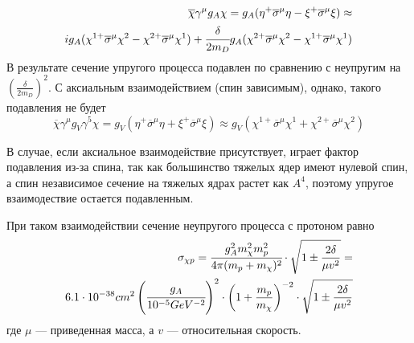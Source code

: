 \begin{equation}
	\begin{split}
	\overline{\chi}\gamma^{\mu}g_A \chi = 
	g_A(\eta^+ \overline{\sigma}^{\mu} \eta - \xi^+ \overline{\sigma}^{\mu} \xi) \approx \\ 
	i g_A (\chi^{1+} \overline{\sigma}^{\mu} \chi^2 - \chi^{2+} \overline{\sigma}^{\mu} \chi^1) + \cfrac{\delta}{2m_D}g_A 
	(
		\chi^{2+} \overline{\sigma}^{\mu}\chi^2 - 
		\chi^{1+}  \overline{\sigma}^{\mu}\chi^1
	)
	\end{split}
\end{equation}
В результате сечение упругого процесса подавлен по сравнению с неупругим на $\left(\frac{\delta}{2m_D}\right)^2$. С аксиальным взаимодействием (спин зависимым), однако, такого подавления не будет
\begin{equation}
	\overline{\chi}\gamma^{\mu}g_V \gamma^5 \chi = 
	g_V(\eta^+ \overline{\sigma}^{\mu} \eta + \xi^+ \overline{\sigma}^{\mu} \xi) \approx  
 g_V (\chi^{1+} \overline{\sigma}^{\mu} \chi^1 + \chi^{2+} \overline{\sigma}^{\mu} \chi^2)
\end{equation}

В случае, если аксиальное взаимодействие присутствует, играет фактор подавления из-за спина, так как большинство тяжелых ядер имеют нулевой спин, а спин независимое сечение на тяжелых ядрах растет как $A^4$, поэтому упругое взаимодествие остается подавленным.

При таком взаимодействии сечение неупругого процесса с протоном равно
\begin{equation}
\begin{split}
	\sigma_{\chi p} = 
	\cfrac{g_A^2m_{\chi}^2m_{p}^2}{4\pi(m_{p}+m_{\chi})^2}\cdot
	\sqrt{1\pm\frac{2\delta}{\mu v^2}} = \\ 
	{6.1}\cdot 10^{-38} cm^2
	\left(\cfrac{g_A}{10^{-5} GeV^{-2}}\right)^2  \cdot \left(1 + \frac{m_p}{m_{\chi}}\right)^{-2} \cdot \sqrt{1\pm\frac{2\delta}{\mu v^2}}
\end{split}	
\end{equation}
где $\mu$ --- приведенная масса, а $v$ --- относительная скорость. 


